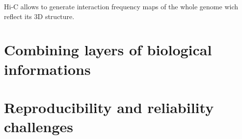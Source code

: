 Hi-C allows to generate interaction frequency maps of the whole genome wich reflect its 3D structure.

\section{Combining layers of biological informations}

\section{Reproducibility and reliability challenges}
